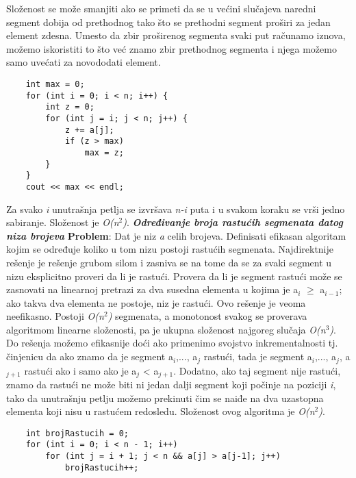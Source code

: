 \documentclass{article}
\begin{document}
\newline Složenost se može smanjiti ako se primeti da se u većini
slučajeva naredni segment dobija od prethodnog tako što se prethodni segment
proširi za jedan element zdesna. Umesto da zbir proširenog segmenta svaki put
računamo iznova, možemo iskoristiti to što već znamo zbir prethodnog segmenta
i njega možemo samo uvećati za novododati element.
\begin{lstlisting}
    int max = 0;
    for (int i = 0; i < n; i++) {
        int z = 0;
        for (int j = i; j < n; j++) {
            z += a[j];
            if (z > max)
                max = z;
        }
    }
    cout << max << endl;
\end{lstlisting}
Za svako \textit{i} unutrašnja petlja se izvršava
\textit{n-i} puta i u svakom koraku se vrši jedno sabiranje. Složenost je \textit{O(n$^2$)}.
\vspace{0.5cm} \newline \textbf{\textit{Određivanje broja rastućih segmenata datog niza brojeva}}
\newline \textbf{Problem}: Dat je niz \textit{a} celih brojeva. Definisati efikasan algoritam kojim se
određuje koliko u tom nizu postoji rastućih segmenata.
\newline Najdirektnije rešenje je rešenje grubom silom i zasniva se na tome da se za svaki
segment u nizu eksplicitno proveri da li je rastući. Provera da li je segment rastući može se zasnovati na linearnoj pretrazi za dva susedna elementa u kojima
je a$_i$ $\geq$ a$_{i-1}$; ako takva dva elementa ne postoje, niz je rastući. Ovo rešenje je veoma neefikasno. Postoji \textit{O(n$^2$)} segmenata, a monotonost svakog
se proverava algoritmom linearne složenosti, pa je ukupna složenost najgoreg
slučaja \textit{O(n$^3$)}.
\newline Do rešenja možemo efikasnije doći ako primenimo svojstvo inkrementalnosti tj. činjenicu da ako znamo da je segment a$_i$,..., a$_j$ rastući, tada je segment
a$_i$,..., a$_j$, a$_{j+1}$ rastući ako i samo ako je a$_j$ < a$_{j+1}$. Dodatno, ako taj segment
nije rastući, znamo da rastući ne može biti ni jedan dalji segment koji počinje
na poziciji \textit{i}, tako da unutrašnju petlju možemo prekinuti čim se naiđe na dva
uzastopna elementa koji nisu u rastućem redosledu. Složenost ovog algoritma je \textit{O(n$^2$)}.
\begin{lstlisting}
    int brojRastucih = 0;
    for (int i = 0; i < n - 1; i++)
        for (int j = i + 1; j < n && a[j] > a[j-1]; j++)
            brojRastucih++;
\end{lstlisting}
\end{document}

